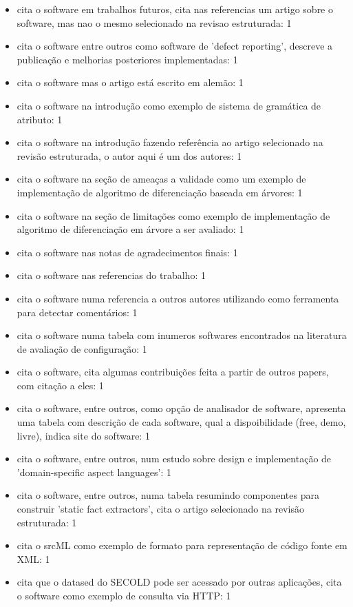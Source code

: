 \begin{itemize}
\item cita o software em trabalhos futuros, cita nas referencias um artigo sobre o software, mas nao o mesmo selecionado na revisao estruturada: 1
\item cita o software entre outros como software de 'defect reporting', descreve a publicação e melhorias posteriores implementadas: 1
\item cita o software mas o artigo está escrito em alemão: 1
\item cita o software na introdução como exemplo de sistema de gramática de atributo: 1
\item cita o software na introdução fazendo referência ao artigo selecionado na revisão estruturada, o autor aqui é um dos autores: 1
\item cita o software na seção de ameaças a validade como um exemplo de implementação de algoritmo de diferenciação baseada em árvores: 1
\item cita o software na seção de limitações como exemplo de implementação de algoritmo de diferenciação em árvore a ser avaliado: 1
\item cita o software nas notas de agradecimentos finais: 1
\item cita o software nas referencias do trabalho: 1
\item cita o software numa referencia a outros autores utilizando como ferramenta para detectar comentários: 1
\item cita o software numa tabela com inumeros softwares encontrados na literatura de avaliação de configuração: 1
\item cita o software, cita algumas contribuições feita a partir de outros papers, com citação a eles: 1
\item cita o software, entre outros, como opção de analisador de software, apresenta uma tabela com descrição de cada software, qual a dispoibilidade (free, demo, livre), indica site do software: 1
\item cita o software, entre outros, num estudo sobre design e implementação de 'domain-specific aspect languages': 1
\item cita o software, entre outros, numa tabela resumindo componentes para construir 'static fact extractors', cita o artigo selecionado na revisão estruturada: 1
\item cita o srcML como exemplo de formato para representação de código fonte em XML: 1
\item cita que o datased do SECOLD pode ser acessado por outras aplicações, cita o software como exemplo de consulta via HTTP: 1

\end{itemize}
